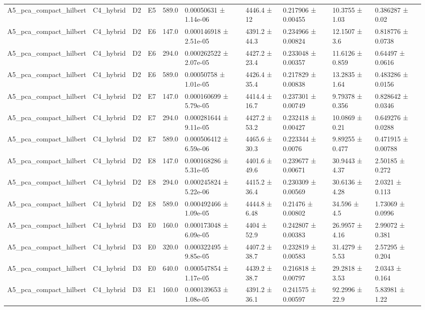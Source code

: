 \begin{table}
\begin{tabular}{llllllllll}
A5\_pca\_compact\_hilbert & C4\_hybrid & D2 & E5 & 589.0 & 0.00050631 ± 1.14e-06 & 4446.4 ± 12 & 0.217906 ± 0.00455 & 10.3755 ± 1.03 & 0.386287 ± 0.02 \\
A5\_pca\_compact\_hilbert & C4\_hybrid & D2 & E6 & 147.0 & 0.000146918 ± 2.51e-05 & 4391.2 ± 44.3 & 0.234966 ± 0.00824 & 12.1507 ± 3.6 & 0.818776 ± 0.0738 \\
A5\_pca\_compact\_hilbert & C4\_hybrid & D2 & E6 & 294.0 & 0.000262522 ± 2.07e-05 & 4427.2 ± 23.4 & 0.233048 ± 0.00357 & 11.6126 ± 0.859 & 0.64497 ± 0.0616 \\
A5\_pca\_compact\_hilbert & C4\_hybrid & D2 & E6 & 589.0 & 0.00050758 ± 1.01e-05 & 4426.4 ± 35.4 & 0.217829 ± 0.00838 & 13.2835 ± 1.64 & 0.483286 ± 0.0156 \\
A5\_pca\_compact\_hilbert & C4\_hybrid & D2 & E7 & 147.0 & 0.000160699 ± 5.79e-05 & 4414.4 ± 16.7 & 0.237301 ± 0.00749 & 9.79378 ± 0.356 & 0.828642 ± 0.0346 \\
A5\_pca\_compact\_hilbert & C4\_hybrid & D2 & E7 & 294.0 & 0.000281644 ± 9.11e-05 & 4427.2 ± 53.2 & 0.232418 ± 0.00427 & 10.0869 ± 0.21 & 0.649276 ± 0.0288 \\
A5\_pca\_compact\_hilbert & C4\_hybrid & D2 & E7 & 589.0 & 0.000506412 ± 6.59e-06 & 4465.6 ± 30.3 & 0.223344 ± 0.0076 & 9.89255 ± 0.477 & 0.471915 ± 0.00788 \\
A5\_pca\_compact\_hilbert & C4\_hybrid & D2 & E8 & 147.0 & 0.000168286 ± 5.31e-05 & 4401.6 ± 49.6 & 0.239677 ± 0.00671 & 30.9443 ± 4.37 & 2.50185 ± 0.272 \\
A5\_pca\_compact\_hilbert & C4\_hybrid & D2 & E8 & 294.0 & 0.000245824 ± 5.22e-06 & 4415.2 ± 36.4 & 0.230309 ± 0.00569 & 30.6136 ± 4.28 & 2.0321 ± 0.113 \\
A5\_pca\_compact\_hilbert & C4\_hybrid & D2 & E8 & 589.0 & 0.000492466 ± 1.09e-05 & 4444.8 ± 6.48 & 0.21476 ± 0.00802 & 34.596 ± 4.5 & 1.73069 ± 0.0996 \\
A5\_pca\_compact\_hilbert & C4\_hybrid & D3 & E0 & 160.0 & 0.000173048 ± 6.09e-05 & 4404 ± 52.9 & 0.242807 ± 0.00383 & 26.9957 ± 4.16 & 2.99072 ± 0.381 \\
A5\_pca\_compact\_hilbert & C4\_hybrid & D3 & E0 & 320.0 & 0.000322495 ± 9.85e-05 & 4407.2 ± 38.7 & 0.232819 ± 0.00583 & 31.4279 ± 5.53 & 2.57295 ± 0.204 \\
A5\_pca\_compact\_hilbert & C4\_hybrid & D3 & E0 & 640.0 & 0.000547854 ± 1.17e-05 & 4439.2 ± 38.7 & 0.216818 ± 0.00797 & 29.2818 ± 3.53 & 2.0343 ± 0.164 \\
A5\_pca\_compact\_hilbert & C4\_hybrid & D3 & E1 & 160.0 & 0.000139653 ± 1.08e-05 & 4391.2 ± 36.1 & 0.241575 ± 0.00597 & 92.2996 ± 22.9 & 5.83981 ± 1.22 \\

\end{tabular}
\end{table}
